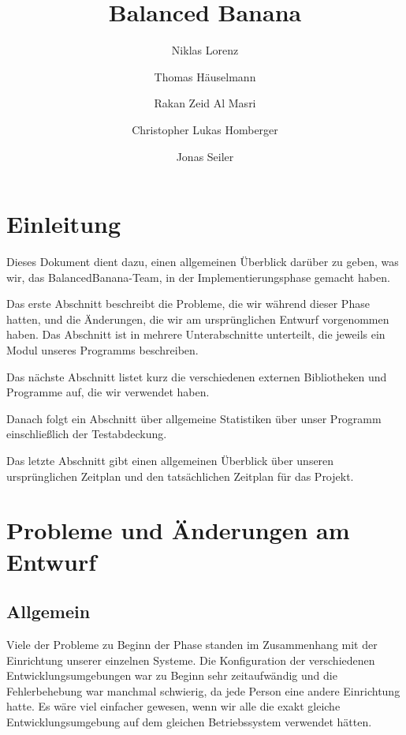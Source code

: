 \documentclass[a4paper,12pt]{article}
\title{Balanced Banana}
\author{Niklas Lorenz \and Thomas Häuselmann \and Rakan Zeid Al Masri \and Christopher Lukas Homberger \and Jonas Seiler}
\begin{document}
\setcounter{page}{2}
\tableofcontents          %
\clearpage
{}

\section{Einleitung}
\vspace{0.2cm}
Dieses Dokument dient dazu, einen allgemeinen Überblick darüber zu geben, was wir, das BalancedBanana-Team, in der Implementierungsphase gemacht haben. \par
\vspace{5mm}

Das erste Abschnitt beschreibt die Probleme, die wir während dieser Phase hatten, und die Änderungen, die wir am ursprünglichen Entwurf vorgenommen haben. Das Abschnitt ist in mehrere Unterabschnitte unterteilt, die jeweils ein Modul unseres Programms beschreiben.\par 
\vspace{5mm}

Das nächste Abschnitt listet kurz die verschiedenen externen Bibliotheken und Programme auf, die wir verwendet haben.\par 
\vspace{5mm}

Danach folgt ein Abschnitt über allgemeine Statistiken über unser Programm einschließlich der Testabdeckung.\par
\vspace{5mm}

Das letzte Abschnitt gibt einen allgemeinen Überblick über unseren ursprünglichen Zeitplan und den tatsächlichen Zeitplan für das Projekt.

\clearpage
\section{Probleme und Änderungen am Entwurf}
\subsection{Allgemein}
\vspace{0.2cm}
Viele der Probleme zu Beginn der Phase standen im Zusammenhang mit der Einrichtung unserer einzelnen Systeme. Die Konfiguration der verschiedenen Entwicklungsumgebungen war zu Beginn sehr zeitaufwändig und die Fehlerbehebung war manchmal schwierig, da jede Person eine andere Einrichtung hatte. Es wäre viel einfacher gewesen, wenn wir alle die exakt gleiche Entwicklungsumgebung auf dem gleichen Betriebssystem verwendet hätten.
\clearpage
\end{document}
